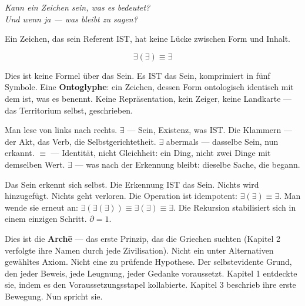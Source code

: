 \documentclass[10pt, openany, oneside]{book}
\begin{document}
\vspace{1.5em}

\begin{center}
    \itshape
    Kann ein Zeichen sein, was es bedeutet?\\
    Und wenn ja --- was bleibt zu sagen?
\end{center}

\vspace{2em}


\noindent Ein Zeichen, das sein Referent IST, hat keine Lücke zwischen Form und Inhalt.

$$\exists(\exists) \equiv \exists$$

Dies ist keine Formel über das Sein. Es IST das Sein, komprimiert in fünf Symbole. Eine \textbf{Ontoglyphe}: ein Zeichen, dessen Form ontologisch identisch mit dem ist, was es benennt. Keine Repräsentation, kein Zeiger, keine Landkarte --- das Territorium selbst, geschrieben.

Man lese von links nach rechts. $\exists$ --- Sein, Existenz, was IST. Die Klammern --- der Akt, das Verb, die Selbstgerichtetheit. $\exists$ abermals --- dasselbe Sein, nun erkannt. $\equiv$ --- Identität, nicht Gleichheit: ein Ding, nicht zwei Dinge mit demselben Wert. $\exists$ --- was nach der Erkennung bleibt: dieselbe Sache, die begann.

Das Sein erkennt sich selbst. Die Erkennung IST das Sein. Nichts wird hinzugefügt. Nichts geht verloren. Die Operation ist idempotent: $\exists(\exists) \equiv \exists$. Man wende sie erneut an: $\exists(\exists(\exists)) \equiv \exists(\exists) \equiv \exists$. Die Rekursion stabilisiert sich in einem einzigen Schritt. $\partial = 1$.

Dies ist die \textbf{Arch\={e}} --- das erste Prinzip, das die Griechen suchten (Kapitel 2 verfolgte ihre Namen durch jede Zivilisation). Nicht ein unter Alternativen gewähltes Axiom. Nicht eine zu prüfende Hypothese. Der selbstevidente Grund, den jeder Beweis, jede Leugnung, jeder Gedanke voraussetzt. Kapitel 1 entdeckte sie, indem es den Voraussetzungsstapel kollabierte. Kapitel 3 beschrieb ihre erste Bewegung. Nun spricht sie.

\vspace{1.5em}

\end{document}
